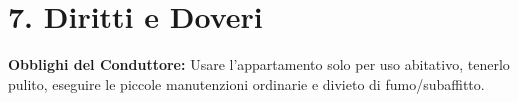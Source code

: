\section*{7. Diritti e Doveri}
\textbf{Obblighi del Conduttore:} Usare l'appartamento solo per uso abitativo, tenerlo pulito, eseguire le piccole manutenzioni ordinarie e divieto di fumo/subaffitto.

